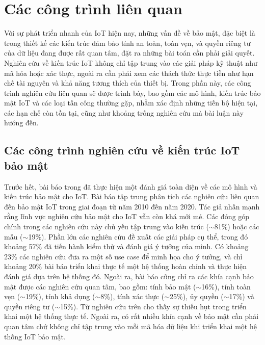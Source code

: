 \chapter{Các công trình liên quan}
\label{Chapter2}
Với sự phát triển nhanh của IoT hiện nay, những vấn đề về bảo mật, đặc biệt là trong thiết kế các kiến trúc đảm bảo tính an toàn, toàn vẹn, và quyền riêng tư của dữ liệu đang được rất quan tâm, đặt ra những bài toán cần phải giải quyết. Nghiên cứu về kiến trúc IoT không chỉ tập trung vào các giải pháp kỹ thuật như mã hóa hoặc xác thực, ngoài ra cần phải xem các thách thức thực tiễn như hạn chế tài nguyên và khả năng tương thích của thiết bị. Trong phần này, các công trình nghiên cứu liên quan sẽ được trình bày, bao gồm các mô hình, kiến trúc bảo mật IoT và các loại tấn công thường gặp, nhằm xác định những tiến bộ hiện tại, các hạn chế còn tồn tại, cũng như khoảng trống nghiên cứu mà bài luận này hướng đến.

\section{Các công trình nghiên cứu về kiến trúc IoT bảo mật}
Trước hết, bài báo trong \cite{a-decade} đã thực hiện một đánh giá toàn diện về các mô hình và kiến trúc bảo mật cho IoT. Bài báo tập trung phân tích các nghiên cứu liên quan đến bảo mật IoT trong giai đoạn từ năm 2010 đến năm 2020. Tác giả nhấn mạnh rằng lĩnh vực nghiên cứu bảo mật cho IoT vẫn còn khá mới mẻ. Các đóng góp chính trong các nghiên cứu này chủ yếu tập trung vào kiến trúc ($\sim$81\%) hoặc các mẫu ($\sim$19\%). Phần lớn các nghiên cứu đề xuất các giải pháp cụ thể, trong đó khoảng 57\% đã tiến hành kiểm thử và đánh giá ý tưởng của mình. Có khoảng 23\% các nghiên cứu đưa ra một số use case để minh họa cho ý tưởng, và chỉ khoảng 20\% bài báo triển khai thực tế một hệ thống hoàn chỉnh và thực hiện đánh giá dựa trên hệ thống đó. Ngoài ra, bài báo \cite{a-decade} cũng chỉ ra các khía cạnh bảo mật được các nghiên cứu quan tâm, bao gồm: tính bảo mật ($\sim$16\%), tính toàn vẹn ($\sim$19\%), tính khả dụng ($\sim$8\%), tính xác thực ($\sim$25\%), ủy quyền ($\sim$17\%) và quyền riêng tư ($\sim$15\%). Từ nghiên cứu trên cho thấy sự thiếu hụt trong triển khai một hệ thống thực tế. Ngoài ra, có rất nhiều khía cạnh về bảo mật cần phải quan tâm chứ không chỉ tập trung vào mỗi mã hóa dữ liệu khi triển khai một hệ thống IoT bảo mật.

